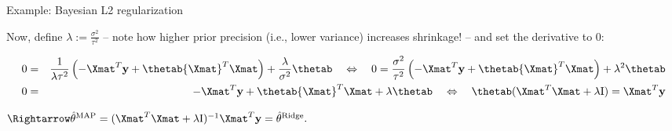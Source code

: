 \begin{vbframe}{Example: Bayesian L2 regularization}
\begin{scriptsize}
\end{scriptsize}

\footnotesize
Now, define $\lambda := \frac{\sigma^2}{\tau^2}$ -- note how higher prior 
precision (i.e., lower variance) increases shrinkage! -- and set the derivative 
to 0:

\begin{scriptsize}
\begin{eqnarray*}
0 &=& \frac{1}{\lambda \tau^2} \left( - {\Xmat}^T \ydat + \thetab {\Xmat}^T \Xmat
\right) + \frac{\lambda}{\sigma^2} \thetab
\quad \Leftrightarrow \quad 0 = \frac{\sigma^2}{\tau^2} \left( - {\Xmat}^T \ydat 
+ \thetab {\Xmat}^T \Xmat \right) + \lambda^2 \thetab \\
0 &=&  - {\Xmat}^T \ydat + \thetab {\Xmat}^T \Xmat + \lambda \thetab 
\quad \Leftrightarrow \quad 
\thetab(\Xmat^T \Xmat  + \lambda \id) = {\Xmat}^T \ydat
\end{eqnarray*}
\end{scriptsize}

$\Rightarrow \thetah^{\text{MAP}} = 
(\Xmat^T \Xmat  + \lambda \id)^{-1} \Xmat^T\ydat  = \thetah^{\text{Ridge}}.$

\end{vbframe}






